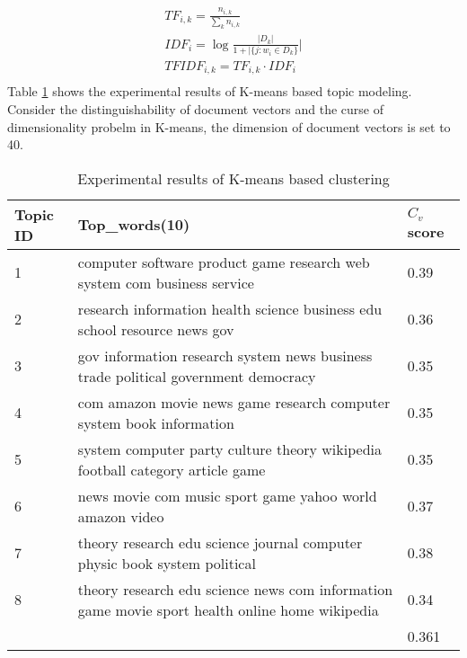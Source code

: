 \begin{displaymath}
    \begin{array}{c}
        TF_{i,k} = \frac{n_{i,k}}{\sum_kn_{i,k}}\\
        IDF_{i} = \log\frac{|D_k|}{1 + |\{j: w_i \in D_k\}}| \\
        TFIDF_{i,k} = TF_{i,k} \cdot IDF_{i}\\
    \end{array}
\end{displaymath}
Table \ref{tab:kmeans1} shows the experimental results of K-means based topic modeling. Consider the distinguishability of document vectors and the curse of dimensionality probelm in K-means, the dimension of document vectors is set to 40.
\begin{table}[!htbp]
    \centering
    \hspace{0.5cm}
    \begin{tabular}{|p{45pt}|p{210pt}|p{50pt}|}
        \hline
        Topic ID & Top\_words(10) & $C_v$ score \\ \hline
        1 & computer software product game research web system com business service & 0.39\\ \hline
        2 & research information health science business edu school resource news gov & 0.36 \\ \hline
        3 & gov information research system news business trade political government democracy & 0.35 \\ \hline
        4 & com amazon movie news game research computer system book information & 0.35 \\ \hline
        5 & system computer party culture theory wikipedia football category article game & 0.35 \\ \hline
        6 & news movie com music sport game yahoo world amazon video & 0.37\\\hline
        7 & theory research edu science journal computer physic book system political & 0.38 \\\hline
        8 & theory research edu science news com information game movie sport health online home wikipedia & 0.34 \\\hline
        & & 0.361 \\ \hline
       
    \end{tabular}
    \caption{Experimental results of K-means based clustering}
    \label{tab:kmeans1}
\end{table}
